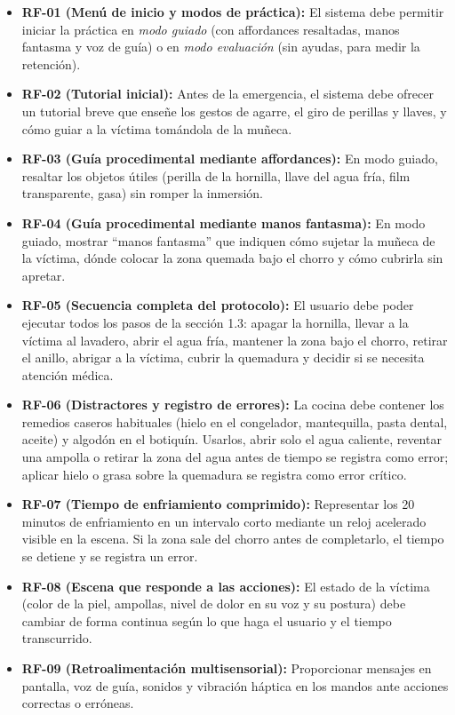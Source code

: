 \documentclass[11pt,letterpaper]{article}
\begin{document}
\begin{itemize}
  \item \textbf{RF-01 (Menú de inicio y modos de práctica):} El sistema debe permitir iniciar la práctica en \textit{modo guiado} (con affordances resaltadas, manos fantasma y voz de guía) o en \textit{modo evaluación} (sin ayudas, para medir la retención).
  \item \textbf{RF-02 (Tutorial inicial):} Antes de la emergencia, el sistema debe ofrecer un tutorial breve que enseñe los gestos de agarre, el giro de perillas y llaves, y cómo guiar a la víctima tomándola de la muñeca.
  \item \textbf{RF-03 (Guía procedimental mediante affordances):} En modo guiado, resaltar los objetos útiles (perilla de la hornilla, llave del agua fría, film transparente, gasa) sin romper la inmersión.
  \item \textbf{RF-04 (Guía procedimental mediante manos fantasma):} En modo guiado, mostrar ``manos fantasma'' que indiquen cómo sujetar la muñeca de la víctima, dónde colocar la zona quemada bajo el chorro y cómo cubrirla sin apretar.
  \item \textbf{RF-05 (Secuencia completa del protocolo):} El usuario debe poder ejecutar todos los pasos de la sección 1.3: apagar la hornilla, llevar a la víctima al lavadero, abrir el agua fría, mantener la zona bajo el chorro, retirar el anillo, abrigar a la víctima, cubrir la quemadura y decidir si se necesita atención médica.
  \item \textbf{RF-06 (Distractores y registro de errores):} La cocina debe contener los remedios caseros habituales (hielo en el congelador, mantequilla, pasta dental, aceite) y algodón en el botiquín. Usarlos, abrir solo el agua caliente, reventar una ampolla o retirar la zona del agua antes de tiempo se registra como error; aplicar hielo o grasa sobre la quemadura se registra como error crítico.
  \item \textbf{RF-07 (Tiempo de enfriamiento comprimido):} Representar los 20 minutos de enfriamiento en un intervalo corto mediante un reloj acelerado visible en la escena. Si la zona sale del chorro antes de completarlo, el tiempo se detiene y se registra un error.
  \item \textbf{RF-08 (Escena que responde a las acciones):} El estado de la víctima (color de la piel, ampollas, nivel de dolor en su voz y su postura) debe cambiar de forma continua según lo que haga el usuario y el tiempo transcurrido.
  \item \textbf{RF-09 (Retroalimentación multisensorial):} Proporcionar mensajes en pantalla, voz de guía, sonidos y vibración háptica en los mandos ante acciones correctas o erróneas.

\end{itemize}
\end{document}
